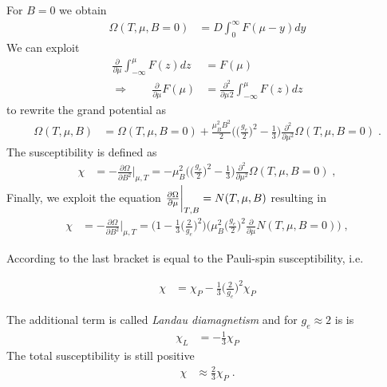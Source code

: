 %
For $B=0$ we obtain
%
\begin{align*}
\Omega(T,\mu,B=0) &= D  \int_{0}^{\infty} F(\mu-y)dy 
\end{align*}
%
We can exploit
%
\begin{align*}
\frac{\partial }{\partial \mu} \int_{-\infty}^{\mu} F(z)dz &= F(\mu)\\
\Rightarrow\qquad  \frac{\partial }{\partial \mu}F(\mu) &= \frac{\partial^{2} }{\partial \mu^{}2} \int_{-\infty}^{\mu} F(z)dz 
\end{align*}
%
to rewrite  the grand potential as
%
\begin{align*}
\Omega(T,\mu,B) &= \Omega(T,\mu,B=0) +
\frac{\mu_{B}^{2}B^{2}}{2}\bigg(  \bigg(\frac{g_{e}}{2}\bigg)^{2} - \frac{1}{3}  \bigg)
 \frac{\partial^{2} }{\partial \mu^{2}}\Omega(T,\mu,B=0)\;.
\end{align*}
%
The susceptibility is defined as 
%
\begin{align*}
\chi&= -\frac{\partial \Omega}{\partial B^{2}}\bigg|_{\mu,T} = 
-\mu_{B}^{2}\bigg(  \bigg(\frac{g_{e}}{2}\bigg)^{2} - \frac{1}{3}  \bigg)
 \frac{\partial^{2} }{\partial \mu^{2}}\Omega(T,\mu,B=0)\;,
\end{align*}
%
Finally, we exploit the equation  $\frac{\partial \Omega}{\partial \mu}\bigg|_{T,B}=N(T,\mu,B)$ resulting in
\begin{align*}
\chi&= -\frac{\partial \Omega}{\partial B^{2}}\bigg|_{\mu,T} = 
 \bigg(  1 - \frac{1}{3} \bigg(\frac{2}{g_{e}}\bigg)^{2} \bigg)
\bigg(\mu_{B}^{2}\bigg(\frac{g_{e}}{2}\bigg)^{2}  \frac{\partial }{\partial \mu}N(T,\mu,B=0)\bigg)\;,
\end{align*}


According to  the last bracket is equal to the Pauli-spin susceptibility, i.e.

\begin{align*}
\chi&= 
\chi_{P} - \frac{1}{3} \bigg(\frac{2}{g_{e}}\bigg)^{2} \chi_{P}
\end{align*}

The additional term is called {\em Landau diamagnetism} and for $g_{e}\approx 2$ is 
is
%
\begin{align*}
\chi_{L}&=-\frac{1}{3} \chi_{P}
\end{align*}
%
The total susceptibility is still positive 
%
\begin{align*}
\chi &\approx \frac{2}{3} \chi_{P}\;.
\end{align*}
%


